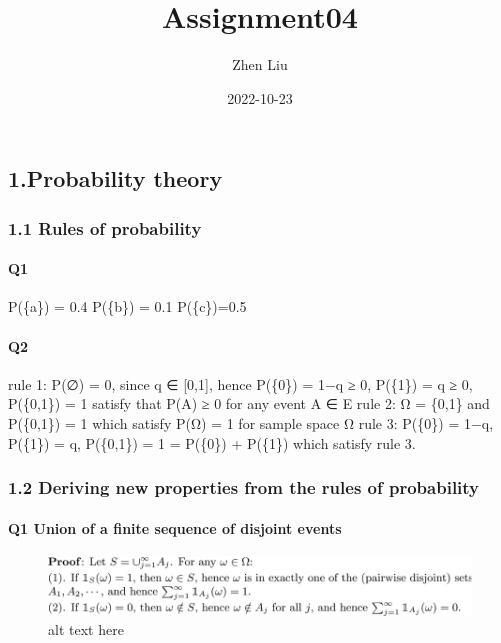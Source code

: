 \documentclass[
]{article}
\title{Assignment04}
\author{Zhen Liu}
\date{2022-10-23}
\begin{document}
\maketitle

\hypertarget{probability-theory}{%
\subsection{1.Probability theory}\label{probability-theory}}

\hypertarget{rules-of-probability}{%
\subsubsection{1.1 Rules of probability}\label{rules-of-probability}}

\hypertarget{q1}{%
\paragraph{Q1}\label{q1}}

P(\{a\}) = 0.4 P(\{b\}) = 0.1 P(\{c\})=0.5

\hypertarget{q2}{%
\paragraph{Q2}\label{q2}}

rule 1: P(∅) = 0, since q ∈ {[}0,1{]}, hence P(\{0\}) = 1−q ≥ 0,
P(\{1\}) = q ≥ 0, P(\{0,1\}) = 1 satisfy that P(A) ≥ 0 for any event A ∈
E rule 2: Ω = \{0,1\} and P(\{0,1\}) = 1 which satisfy P(Ω) = 1 for
sample space Ω rule 3: P(\{0\}) = 1−q, P(\{1\}) = q, P(\{0,1\}) = 1 =
P(\{0\}) + P(\{1\}) which satisfy rule 3.

\hypertarget{deriving-new-properties-from-the-rules-of-probability}{%
\subsubsection{1.2 Deriving new properties from the rules of
probability}\label{deriving-new-properties-from-the-rules-of-probability}}

\hypertarget{q1-union-of-a-finite-sequence-of-disjoint-events}{%
\paragraph{Q1 Union of a finite sequence of disjoint
events}\label{q1-union-of-a-finite-sequence-of-disjoint-events}}

\begin{figure}
\centering
\includegraphics{Picture 1.png}
\caption{alt text here}
\end{figure}
\end{document}
